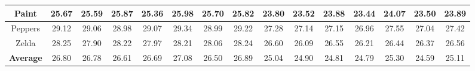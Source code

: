 \begin{table*}[t]
\begin{center}
\begin{tabular}{|c||c|c|c|c|c|c|c||c|c|c|c|c|c|c|}
\\
\hline
 Paint & 25.67 & 25.59 & 25.87 & 25.36 &25.98&25.70 & 25.82     &  23.80 & 23.52 &  23.88 & 23.44 &24.07 &23.50  & 23.89  
\\
\hline
 Peppers & 29.12 & 29.06 & 28.98 & 29.07 & 29.34&28.99 & 29.22     & 27.28 & 27.14 &  27.15 & 26.96 &  27.55   &27.04&  27.42
\\
\hline
 Zelda  & 28.25 & 27.90 & 28.22 & 27.97 & 28.21 & 28.06& 28.24       & 26.60 & 26.09 &  26.55  & 26.21  & 26.44  &26.37& 26.56
\\
\hline
 \textbf{Average}& 26.80 &  26.78 &  26.61  & 26.69  & 27.08& 26.50 & 26.89    &25.04 &24.90 &24.81 &24.79 &25.30 &24.59 &25.11     
\\
\hline
\end{tabular}
\end{center}
\end{table*}
\vspace{-0.1in}
